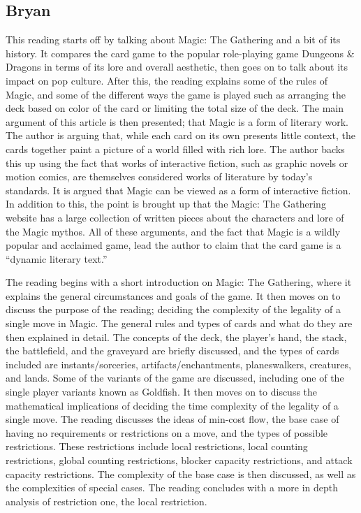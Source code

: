 \documentclass[12pt, letterpaper]{article}
\begin{document}
\subsection{Bryan}

This reading starts off by talking about Magic: The Gathering and a bit of its history.
It compares the card game to the popular role-playing game
Dungeons \& Dragons in terms of its lore and overall aesthetic,
then goes on to talk about its impact on pop culture.
After this, the reading explains some of the rules of Magic,
and some of the different ways the game is played such as arranging the deck based on color of the card or
limiting the total size of the deck.
The main argument of this article is then presented;
that Magic is a form of literary work.
The author is arguing that,
while each card on its own presents little context,
the cards together paint a picture of a world filled with rich lore.
The author backs this up using the fact that works of interactive fiction,
such as graphic novels or motion comics,
are themselves considered works of literature by today’s standards.
It is argued that Magic can be viewed as a form of interactive fiction.
In addition to this, the point is brought up that the Magic: The Gathering website
has a large collection of written pieces about the characters and lore of the Magic mythos.
All of these arguments, and the fact that Magic is a wildly popular and acclaimed game,
lead the author to claim that the card game is a \enquote{dynamic literary text.}

The reading begins with a short introduction on Magic: The Gathering,
where it explains the general circumstances and goals of the game.
It then moves on to discuss the purpose of the reading;
deciding the complexity of the legality of a single move in Magic.
The general rules and types of cards and what do they are then explained in detail.
The concepts of the deck, the player’s hand, the stack, the battlefield,
and the graveyard are briefly discussed, and the types of cards included are instants/sorceries,
artifacts/enchantments, planeswalkers, creatures, and lands.
Some of the variants of the game are discussed,
including one of the single player variants known as Goldfish.
It then moves on to discuss the mathematical implications of
deciding the time complexity of the legality of a single move.
The reading discusses the ideas of min-cost flow,
the base case of having no requirements or restrictions on a move,
and the types of possible restrictions.
These restrictions include local restrictions, local counting restrictions,
global counting restrictions, blocker capacity restrictions, and attack capacity restrictions.
The complexity of the base case is then discussed,
as well as the complexities of special cases.
The reading concludes with a more in depth analysis of restriction one, the local restriction.
\end{document}
